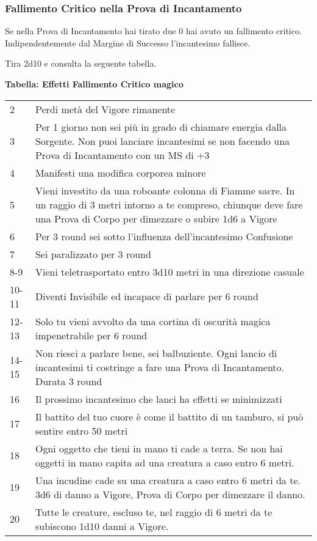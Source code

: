 \documentclass[12pt,a4paper,twoside,openany]{book}
\begin{document}
\begin{multicols}{2}
\subsubsection{Fallimento Critico nella Prova di Incantamento}\label{magiefallimentocriticonellaprovadimagia}

Se nella Prova di Incantamento hai tirato due 0 hai avuto un fallimento critico. Indipendentemente dal Margine di Successo l'incantesimo fallisce.

Tira 2d10 e consulta la seguente tabella.


\textbf{Tabella: Effetti Fallimento Critico magico}

\medskip
{\small
	\begin{tabularx}{0.45\textwidth}{lX}
		\hline
2 & Perdi metà del Vigore rimanente\\
3 & Per 1 giorno non sei più in grado di chiamare energia dalla Sorgente. Non puoi lanciare incantesimi se non facendo una Prova di Incantamento con un MS di +3\\
4 & Manifesti una modifica corporea minore\\
5 & Vieni investito da una roboante colonna di Fiamme sacre. In un raggio di 3 metri intorno a te compreso, chiunque deve fare una Prova di Corpo per dimezzare o subire 1d6 a Vigore\\
6 & Per 3 round sei sotto l'influenza dell'incantesimo Confusione\\
7 & Sei paralizzato per 3 round\\
8-9 & Vieni teletrasportato entro 3d10 metri in una direzione casuale\\
10-11 & Diventi Invisibile ed incapace di parlare per 6 round\\
12-13 &  Solo tu vieni avvolto da una cortina di oscurità magica impenetrabile per 6 round\\
14-15 & Non riesci a parlare bene, sei balbuziente. Ogni lancio di incantesimi ti costringe a fare una Prova di Incantamento. Durata 3 round\\
16 & Il prossimo incantesimo che lanci ha effetti se minimizzati\\
17 & Il battito del tuo cuore è come il battito di un tamburo, si può sentire entro 50 metri\\
18 & Ogni oggetto che tieni in mano ti cade a terra. Se non hai oggetti in mano capita ad una creatura a caso entro 6 metri.\\
19 & Una incudine cade su una creatura a caso entro 6 metri da te. 3d6 di danno a Vigore, Prova di Corpo per dimezzare il danno.\\
20 & Tutte le creature, escluso te, nel raggio di 6 metri da te subiscono 1d10 danni a Vigore.
\end{tabularx}}




\end{multicols}
\end{document}
